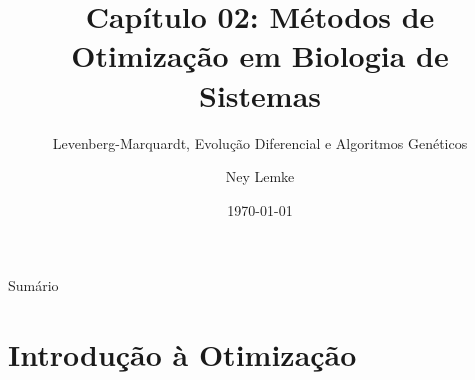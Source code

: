 


\title[Cap. 02: Métodos de Otimização]{Capítulo 02: Métodos de Otimização em Biologia de Sistemas}
\subtitle{Levenberg-Marquardt, Evolução Diferencial e Algoritmos Genéticos}
\author{Ney Lemke}
\date{\today}



\begin{frame}
\titlepage
\end{frame}

\begin{frame}{Sumário}
\tableofcontents
\end{frame}

\section{Introdução à Otimização}

